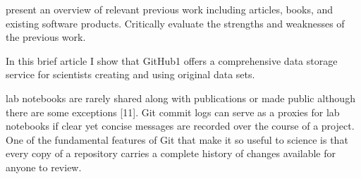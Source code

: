 present an overview of relevant previous work including articles, books, and existing software products. Critically evaluate the strengths and weaknesses of the previous work.


In this brief article I show that GitHub1 offers a comprehensive data storage service for scientists creating and using original data sets. \cite{gandrud2013github}

lab
notebooks are rarely shared along with publications
or made public although there are some exceptions
[11]. Git commit logs can serve as a proxies for lab
notebooks if clear yet concise messages are recorded
over the course of a project. One of the fundamental
features of Git that make it so useful to science is that
every copy of a repository carries a complete history
of changes available for anyone to review. \cite{ram2013git}